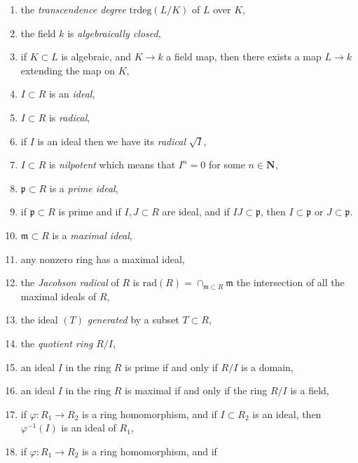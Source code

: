 \begin{enumerate}
\label{transcendence-basis}
\item the {\it transcendence degree} $\text{trdeg}(L/K)$ of $L$
over $K$,
\label{transcendence-degree}
\item the field $k$ is {\it algebraically closed},
\label{algebraically-closed}
\item if $K \subset L$ is algebraic, and $K \to k$ a field map,
then there exists a map $L \to k$ extending the map on $K$,
\label{extend-into-algebraically-closed}
\item $I \subset R$ is an {\it ideal},
\label{ideal}
\item $I \subset R$ is {\it radical},
\label{ideal-radical}
\item if $I$ is an ideal then we have its {\it radical} $\sqrt{I}$,
\label{radical-ideal}
\item $I \subset R$ is {\it nilpotent} which means that $I^n = 0$ for
some $n \in \mathbf{N}$,
\label{ideal-nilpotent}
\item $\mathfrak p \subset R$ is a {\it prime ideal},
\label{prime-ideal}
\item if $\mathfrak p \subset R$ is prime and if $I, J \subset R$
are ideal, and if $IJ\subset \mathfrak p$, then
$I \subset \mathfrak p$ or $J \subset \mathfrak p$.
\label{prime-product-ideals}
\item $\mathfrak m \subset R$ is a {\it maximal ideal},
\label{maximal-ideal}
\item any nonzero ring has a maximal ideal,
\label{exists-maximal-ideal}
\item the {\it Jacobson radical} of $R$ is $\text{rad}(R) =
\cap_{\mathfrak m \subset R} \mathfrak m$ the intersection
of all the maximal ideals of $R$,
\label{jacobson-radical}
\item the ideal $(T)$ {\it generated} by a subset $T \subset R$,
\label{ideal-generated-by}
\item the {\it quotient ring} $R/I$,
\label{quotient-ring}
\item an ideal $I$ in the ring $R$ is prime if and only if $R/I$
is a domain,
\label{characterize-prime-ideal}
\item an ideal $I$ in the ring $R$ is maximal if and only if the
ring $R/I$ is a field,
\label{characterize-maximal-ideal}
\item if $\varphi : R_1 \to R_2$ is a ring homomorphism, and if
$I \subset R_2$ is an ideal, then $\varphi^{-1}(I)$ is an
ideal of $R_1$,
\label{inverse-image-ideal}
\item if $\varphi : R_1 \to R_2$ is a ring homomorphism, and if

\end{enumerate}
